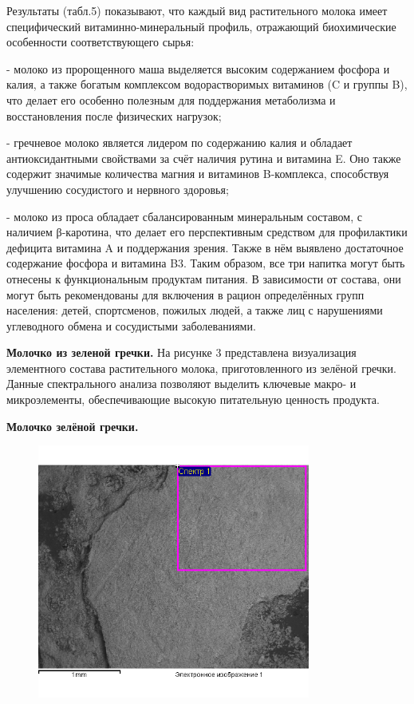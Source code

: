 Результаты (табл.5) показывают, что каждый вид растительного молока
имеет специфический витаминно-минеральный профиль, отражающий
биохимические особенности соответствующего сырья:


- молоко из пророщенного маша выделяется высоким содержанием фосфора и
калия,
а также богатым комплексом водорастворимых витаминов (C и группы B), что
делает его особенно полезным для поддержания метаболизма и
восстановления после физических нагрузок;


- гречневое молоко является лидером по содержанию калия и обладает
антиоксидантными свойствами за счёт наличия рутина и витамина E. Оно
также содержит значимые количества магния и витаминов B-комплекса,
способствуя улучшению сосудистого и нервного здоровья;


- молоко из проса обладает сбалансированным минеральным составом, с
наличием β-каротина, что делает его перспективным средством для
профилактики дефицита витамина A и поддержания зрения. Также в нём
выявлено достаточное содержание фосфора и витамина B3.
Таким образом, все три напитка могут быть отнесены к функциональным
продуктам питания. В зависимости от состава, они могут быть
рекомендованы для включения в рацион определённых групп населения:
детей, спортсменов, пожилых людей, а также лиц с нарушениями углеводного
обмена и сосудистыми заболеваниями.

{\bfseries Молочко из зеленой гречки.} На рисунке 3 представлена
визуализация элементного состава растительного молока, приготовленного
из зелёной гречки. Данные спектрального анализа позволяют выделить
ключевые макро- и микроэлементы, обеспечивающие высокую питательную
ценность продукта.

{\bfseries Молочко зелёной гречки.}

\begin{figure}[H]
	\centering
	\includegraphics[width=0.8\textwidth]{media/pish/image49}
	\caption*{}
\end{figure}

